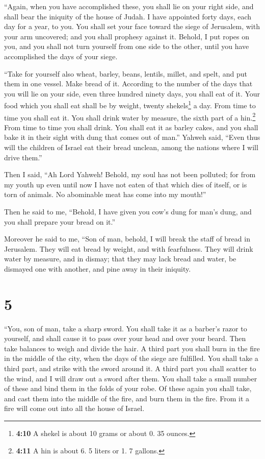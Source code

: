  ``Again, when you have accomplished these, you shall lie
on your right side, and shall bear the iniquity of the house of Judah. I
have appointed forty days, each day for a year, to you. 
You shall set your face toward the siege of Jerusalem, with your arm
uncovered; and you shall prophesy against it.  Behold, I
put ropes on you, and you shall not turn yourself from one side to the
other, until you have accomplished the days of your siege.

 ``Take for yourself also wheat, barley, beans, lentils,
millet, and spelt, and put them in one vessel. Make bread of it.
According to the number of the days that you will lie on your side, even
three hundred ninety days, you shall eat of it.  Your
food which you shall eat shall be by weight, twenty shekels\footnote{\textbf{4:10}
  A shekel is about 10 grams or about 0. 35 ounces.} a day. From time to
time you shall eat it.  You shall drink water by measure,
the sixth part of a hin.\footnote{\textbf{4:11} A hin is about 6. 5
  liters or 1. 7 gallons.} From time to time you shall drink.
 You shall eat it as barley cakes, and you shall bake it
in their sight with dung that comes out of man.''  Yahweh
said, ``Even thus will the children of Israel eat their bread unclean,
among the nations where I will drive them.''

 Then I said, ``Ah Lord Yahweh! Behold, my soul has not
been polluted; for from my youth up even until now I have not eaten of
that which dies of itself, or is torn of animals. No abominable meat has
come into my mouth!''

 Then he said to me, ``Behold, I have given you cow's
dung for man's dung, and you shall prepare your bread on it.''

 Moreover he said to me, ``Son of man, behold, I will
break the staff of bread in Jerusalem. They will eat bread by weight,
and with fearfulness. They will drink water by measure, and in dismay;
 that they may lack bread and water, be dismayed one with
another, and pine away in their iniquity.

\hypertarget{section-4}{%
\section{5}\label{section-4}}

 ``You, son of man, take a sharp sword. You shall take it
as a barber's razor to yourself, and shall cause it to pass over your
head and over your beard. Then take balances to weigh and divide the
hair.  A third part you shall burn in the fire in the
middle of the city, when the days of the siege are fulfilled. You shall
take a third part, and strike with the sword around it. A third part you
shall scatter to the wind, and I will draw out a sword after them.
 You shall take a small number of these and bind them in
the folds of your robe.  Of these again you shall take,
and cast them into the middle of the fire, and burn them in the fire.
From it a fire will come out into all the house of Israel.

